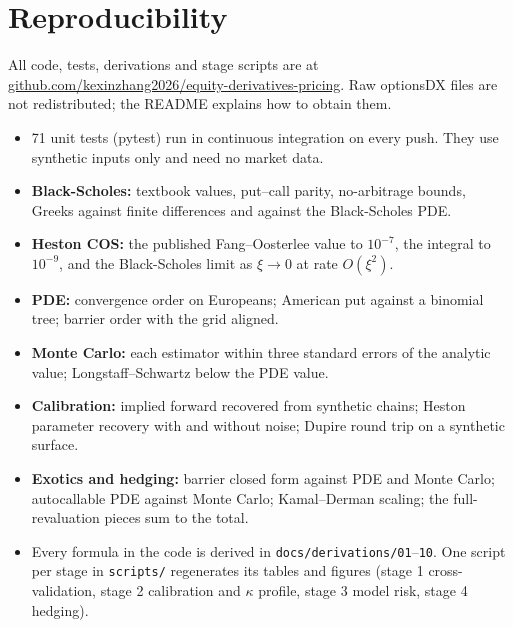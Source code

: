 \documentclass[10pt,letterpaper]{article}
\begin{document}
\section{Reproducibility}
All code, tests, derivations and stage scripts are at \href{https://github.com/kexinzhang2026/equity-derivatives-pricing}{github.com/kexinzhang2026/equity-derivatives-pricing}. Raw optionsDX files are not redistributed; the README explains how to obtain them.
\begin{itemize}
\item 71 unit tests (pytest) run in continuous integration on every push. They use synthetic inputs only and need no market data.
\item \textbf{Black-Scholes:} textbook values, put--call parity, no-arbitrage bounds, Greeks against finite differences and against
the Black-Scholes PDE.
\item \textbf{Heston COS:} the published Fang--Oosterlee value to $10^{-7}$, the \citet{lewis2001} integral to $10^{-9}$, and the
Black-Scholes limit as $\xi\to0$ at rate $O(\xi^2)$.
\item \textbf{PDE:} convergence order on Europeans; American put against a binomial tree; barrier order with the grid aligned.
\item \textbf{Monte Carlo:} each estimator within three standard errors of the analytic value; Longstaff--Schwartz below the PDE value.
\item \textbf{Calibration:} implied forward recovered from synthetic chains; Heston parameter recovery with and without noise; Dupire
round trip on a synthetic surface.
\item \textbf{Exotics and hedging:} barrier closed form against PDE and Monte Carlo; autocallable PDE against Monte Carlo;
Kamal--Derman scaling; the full-revaluation pieces sum to the total.
\item Every formula in the code is derived in \texttt{docs/derivations/01}--\texttt{10}. One script per stage in \texttt{scripts/}
regenerates its tables and figures (stage 1 cross-validation, stage 2 calibration and $\kappa$ profile, stage 3 model risk,
stage 4 hedging).
\end{itemize}


\renewcommand{\bibfont}{\footnotesize}
\setlength{\bibsep}{2pt}
\renewcommand{\bibsection}{\needspace{12\baselineskip}\section*{References}\markboth{References}{}}

\end{document}
